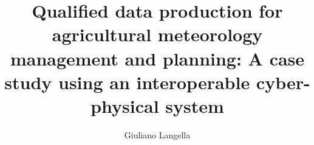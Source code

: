 \documentclass[authoryear,preprint,review,12pt]{elsarticle}
\newcommand{\note}[1]{\emph{\textcolor{red}{#1}}}
\newcommand{\review}[1]{\emph{\textcolor{cyan}{#1}}}
\begin{document}
\begin{frontmatter}



\title{ Qualified data production for agricultural meteorology management and planning: A case study using an interoperable cyber-physical system }


\author[dia,crisp]{Giuliano Langella}
\address[dia]{Department of Agriculture, University of Naples Federico II, Via Università 100, 80055 Portici, NA, Italy}
\address[crisp]{Interdepartmental Research Centre on Earth Critical Zone, University of Naples Federico II, Via Università 100, 80055 Portici, NA, Italy}



\end{frontmatter}
\end{document}
